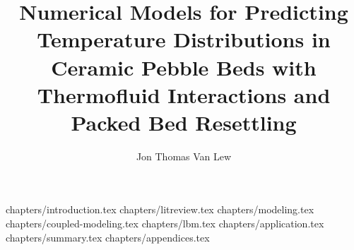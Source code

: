 \documentclass [PhD] {uclathes}
\title      {Numerical Models for Predicting Temperature Distributions in Ceramic Pebble Beds with Thermofluid Interactions and Packed Bed Resettling}
\author     {Jon Thomas Van Lew}
\begin{document}
   
\makeintropages
		{chapters/introduction.tex}
		{chapters/litreview.tex}
		{chapters/modeling.tex}
		{chapters/coupled-modeling.tex}
		{chapters/lbm.tex}
		{chapters/application.tex}
		{chapters/summary.tex}
		{chapters/appendices.tex}


\end{document}

